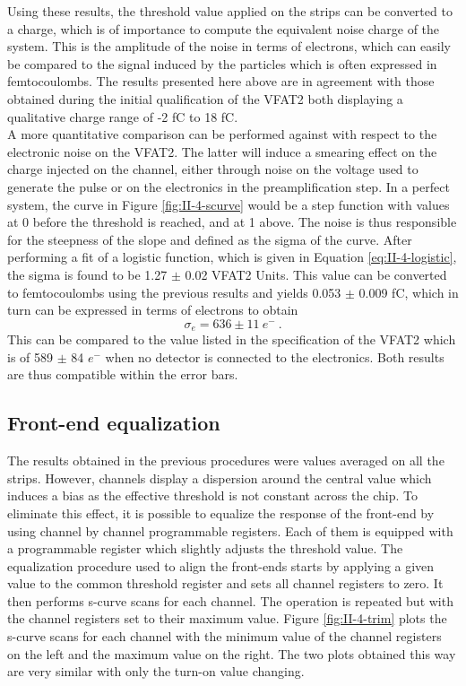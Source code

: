       Using these results, the threshold value applied on the strips can be converted to a charge, which is of importance to compute the equivalent noise charge of the system. This is the amplitude of the noise in terms of electrons, which can easily be compared to the signal induced by the particles which is often expressed in femtocoulombs. The results presented here above are in agreement with those obtained during the initial qualification of the VFAT2 \cite{Aspell:1267947} both displaying a qualitative charge range of -2 fC to 18 fC. \\

      A more quantitative comparison can be performed against \cite{Aspell:1069906} with respect to the electronic noise on the VFAT2. The latter will induce a smearing effect on the charge injected on the channel, either through noise on the voltage used to generate the pulse or on the electronics in the preamplification step. In a perfect system, the curve in Figure \ref{fig:II-4-scurve} would be a step function with values at 0 before the threshold is reached, and at 1 above. The noise is thus responsible for the steepness of the slope and defined as the sigma of the curve. After performing a fit of a logistic function, which is given in Equation \ref{eq:II-4-logistic}, the sigma is found to be 1.27 $\pm$ 0.02 VFAT2 Units. This value can be converted to femtocoulombs using the previous results and yields 0.053 $\pm$ 0.009 fC, which in turn can be expressed in terms of electrons to obtain
      \begin{equation}
        \sigma_e = 636 \pm 11 \ e^- \ .
      \end{equation}
      This can be compared to the value listed in the specification of the VFAT2 which is of 589 $\pm$ 84 $e^-$ when no detector is connected to the electronics. Both results are thus compatible within the error bars.

    \subsection{Front-end equalization}

      The results obtained in the previous procedures were values averaged on all the strips. However, channels display a dispersion around the central value which induces a bias as the effective threshold is not constant across the chip. To eliminate this effect, it is possible to equalize the response of the front-end by using channel by channel programmable registers. Each of them is equipped with a programmable register which slightly adjusts the threshold value. The equalization procedure used to align the front-ends starts by applying a given value to the common threshold register and sets all channel registers to zero. It then performs s-curve scans for each channel. The operation is repeated but with the channel registers set to their maximum value. Figure \ref{fig:II-4-trim} plots the s-curve scans for each channel with the minimum value of the channel registers on the left and the maximum value on the right. The two plots obtained this way are very similar with only the turn-on value changing. \\


